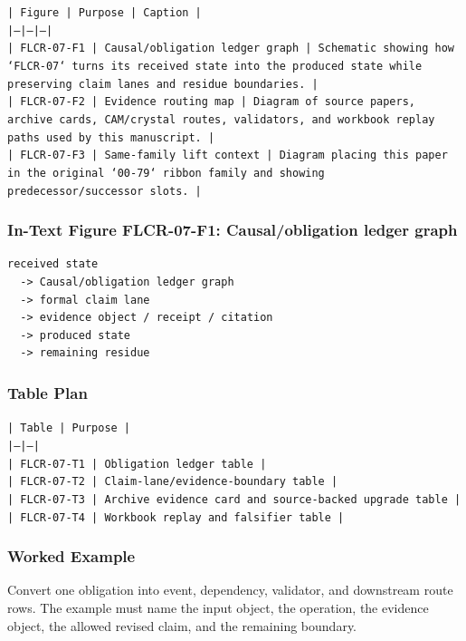 \documentclass[11pt]{article}
\begin{document}
\noindent\texttt{| Figure | Purpose | Caption |}\\
\noindent\texttt{|---|---|---|}\\
\noindent\texttt{| FLCR-07-F1 | Causal/obligation ledger graph | Schematic showing how `FLCR-07` turns its received state into the produced state while preserving claim lanes and residue boundaries. |}\\
\noindent\texttt{| FLCR-07-F2 | Evidence routing map | Diagram of source papers, archive cards, CAM/crystal routes, validators, and workbook replay paths used by this manuscript. |}\\
\noindent\texttt{| FLCR-07-F3 | Same-family lift context | Diagram placing this paper in the original `00-79` ribbon family and showing predecessor/successor slots. |}\\

\subsubsection*{In-Text Figure FLCR-07-F1: Causal/obligation ledger graph}

\begin{verbatim}
received state
  -> Causal/obligation ledger graph
  -> formal claim lane
  -> evidence object / receipt / citation
  -> produced state
  -> remaining residue
\end{verbatim}

\subsubsection*{Table Plan}

\noindent\texttt{| Table | Purpose |}\\
\noindent\texttt{|---|---|}\\
\noindent\texttt{| FLCR-07-T1 | Obligation ledger table |}\\
\noindent\texttt{| FLCR-07-T2 | Claim-lane/evidence-boundary table |}\\
\noindent\texttt{| FLCR-07-T3 | Archive evidence card and source-backed upgrade table |}\\
\noindent\texttt{| FLCR-07-T4 | Workbook replay and falsifier table |}\\

\subsubsection*{Worked Example}

Convert one obligation into event, dependency, validator, and downstream route rows. The example must name the input object, the operation,
the evidence object, the allowed revised claim, and the remaining boundary.
\end{document}
